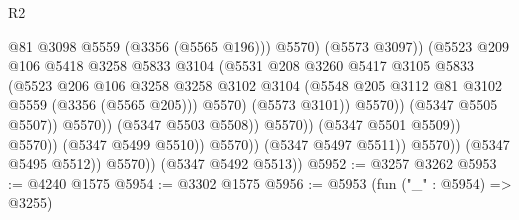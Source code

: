 \begin{lexlean}{R2}
\begin{coremodule}
                                                  @81
                                                  @3098
                                                  @5559
                                                  (@3356 (@5565 @196)))
                                                @5570)
                                              (@5573 @3097))
                                            (@5523
                                              @209
                                              @106
                                              @5418
                                              @3258
                                              @5833
                                              @3104
                                              (@5531
                                                @208
                                                @3260
                                                @5417
                                                @3105
                                                @5833
                                                (@5523
                                                  @206
                                                  @106
                                                  @3258
                                                  @3258
                                                  @3102
                                                  @3104
                                                  (@5548
                                                    @205
                                                    @3112
                                                    @81
                                                    @3102
                                                    @5559
                                                    (@3356 (@5565 @205)))
                                                  @5570)
                                                (@5573 @3101))
                                              @5570))
                                          (@5347 @5505 @5507))
                                        @5570))
                                    (@5347 @5503 @5508))
                                  @5570))
                              (@5347 @5501 @5509))
                            @5570))
                        (@5347 @5499 @5510))
                      @5570))
                  (@5347 @5497 @5511))
                @5570))
            (@5347 @5495 @5512))
          @5570))
      (@5347 @5492 @5513))
@5952 := @3257 @3262
@5953 := @4240 @1575
@5954 := @3302 @1575
@5956 := @5953 (fun ("_" : @5954) => @3255)

\end{coremodule}
\end{lexlean}
